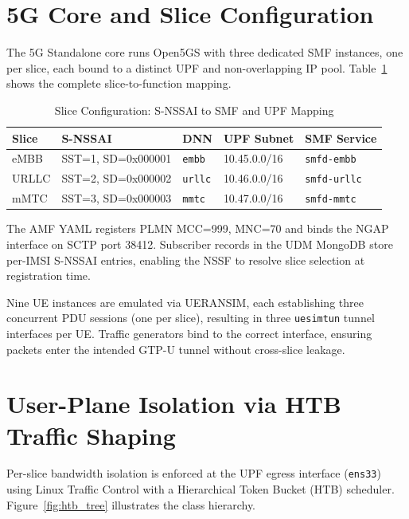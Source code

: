 \section{5G Core and Slice Configuration}

The 5G Standalone core runs Open5GS with three dedicated SMF instances, one per
slice, each bound to a distinct UPF and non-overlapping IP pool.
Table~\ref{tab:slice_config} shows the complete slice-to-function mapping.

\begin{table}[H]
\centering
\caption{Slice Configuration: S-NSSAI to SMF and UPF Mapping}
\label{tab:slice_config}
\begin{tabular}{lllll}
\toprule
\textbf{Slice} & \textbf{S-NSSAI} & \textbf{DNN} & \textbf{UPF Subnet} & \textbf{SMF Service} \\
\midrule
eMBB  & SST=1, SD=0x000001 & \texttt{embb}  & 10.45.0.0/16 & \texttt{smfd-embb}  \\
URLLC & SST=2, SD=0x000002 & \texttt{urllc} & 10.46.0.0/16 & \texttt{smfd-urllc} \\
mMTC  & SST=3, SD=0x000003 & \texttt{mmtc}  & 10.47.0.0/16 & \texttt{smfd-mmtc}  \\
\bottomrule
\end{tabular}
\end{table}

The AMF YAML registers PLMN MCC=999, MNC=70 and binds the NGAP interface on SCTP
port 38412. Subscriber records in the UDM MongoDB store per-IMSI S-NSSAI entries,
enabling the NSSF to resolve slice selection at registration time.

Nine UE instances are emulated via UERANSIM, each establishing three concurrent
PDU sessions (one per slice), resulting in three \texttt{uesimtun} tunnel
interfaces per UE. Traffic generators bind to the correct interface, ensuring
packets enter the intended GTP-U tunnel without cross-slice leakage.

\section{User-Plane Isolation via HTB Traffic Shaping}

Per-slice bandwidth isolation is enforced at the UPF egress interface
(\texttt{ens33}) using Linux Traffic Control with a Hierarchical Token Bucket
(HTB) scheduler. Figure~\ref{fig:htb_tree} illustrates the class hierarchy.

